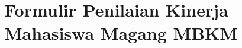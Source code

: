 \documentclass[12pt,a4paper,oneside]{report}
\begin{document}
\section*{Formulir Penilaian Kinerja Mahasiswa Magang MBKM}

\end{document}
